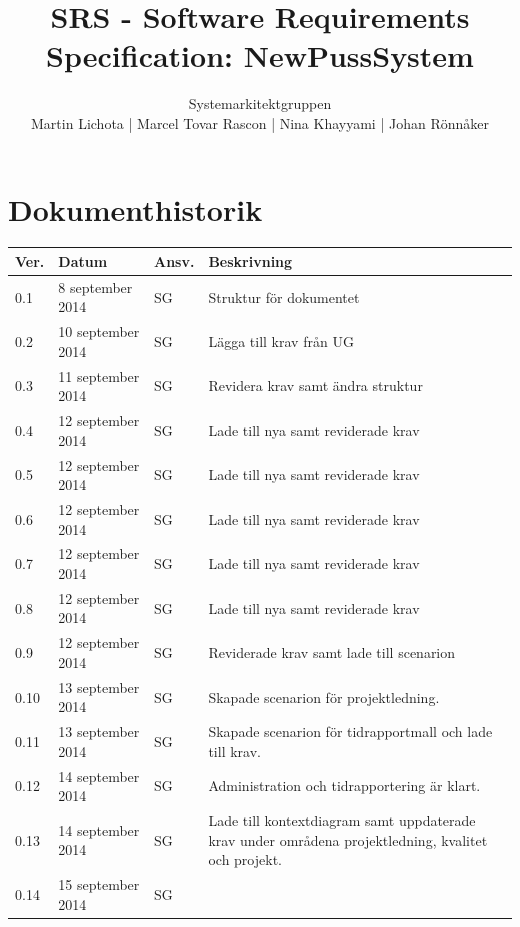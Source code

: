 \documentclass[a4paper]{article}
\title{SRS - Software Requirements Specification: NewPussSystem}
\author{Systemarkitektgruppen \\ Martin Lichota | Marcel Tovar Rascon | Nina Khayyami | Johan Rönnåker}
\date{}
\begin{document}
\maketitle
\thispagestyle{fancy}
\tableofcontents
\newpage

\section*{Dokumenthistorik}

\begin{tabular}{ l l l p{8.5cm} }
Ver. & Datum & Ansv. & Beskrivning \\\hline
0.1 & 8 september 2014 & SG & Struktur för dokumentet\\
0.2 & 10 september 2014 & SG & Lägga till krav från UG\\
0.3 & 11 september 2014 & SG & Revidera krav samt ändra struktur\\
0.4 & 12 september 2014 & SG & Lade till nya samt reviderade krav\\
0.5 & 12 september 2014 & SG & Lade till nya samt reviderade krav\\
0.6 & 12 september 2014 & SG & Lade till nya samt reviderade krav\\
0.7 & 12 september 2014 & SG & Lade till nya samt reviderade krav\\
0.8 & 12 september 2014 & SG & Lade till nya samt reviderade krav\\
0.9 & 12 september 2014 & SG & Reviderade krav samt lade till scenarion\\
0.10 & 13 september 2014 & SG & Skapade scenarion för projektledning.\\
0.11 & 13 september 2014 & SG & Skapade scenarion för tidrapportmall och lade till krav.\\
0.12 & 14 september 2014 & SG & Administration och tidrapportering är klart.\\
0.13 & 14 september 2014 & SG & Lade till kontextdiagram samt uppdaterade krav under områdena projektledning, kvalitet och projekt.\\
0.14 & 15 september 2014 & SG & 


\end{tabular}
\end{document}
